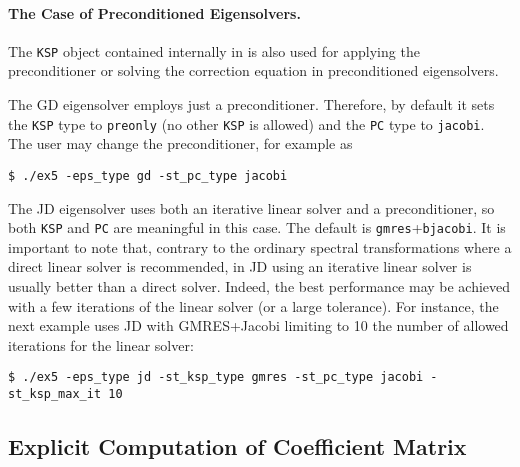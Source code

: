 \paragraph{The Case of Preconditioned Eigensolvers.}

	The \texttt{KSP} object contained internally in  is also used for applying the preconditioner or solving the correction equation in preconditioned eigensolvers.

	The GD eigensolver employs just a preconditioner. Therefore, by default it sets the \texttt{KSP} type to \texttt{preonly} (no other \texttt{KSP} is allowed) and the \texttt{PC} type to \texttt{jacobi}. The user may change the preconditioner, for example as
\begin{Verbatim}[fontsize=\small]
	$ ./ex5 -eps_type gd -st_pc_type jacobi
\end{Verbatim}

	The JD eigensolver uses both an iterative linear solver and a preconditioner, so both \texttt{KSP} and \texttt{PC} are meaningful in this case. The default is \texttt{gmres}+\texttt{bjacobi}. It is important to note that, contrary to the ordinary spectral transformations where a direct linear solver is recommended, in JD using an iterative linear solver is usually better than a direct solver. Indeed, the best performance may be achieved with a few iterations of the linear solver (or a large tolerance). For instance, the next example uses JD with GMRES+Jacobi limiting to 10 the number of allowed iterations for the linear solver:
\begin{Verbatim}[fontsize=\small]
	$ ./ex5 -eps_type jd -st_ksp_type gmres -st_pc_type jacobi -st_ksp_max_it 10
\end{Verbatim}

\subsection{Explicit Computation of Coefficient Matrix}
\label{sec:explicit}


